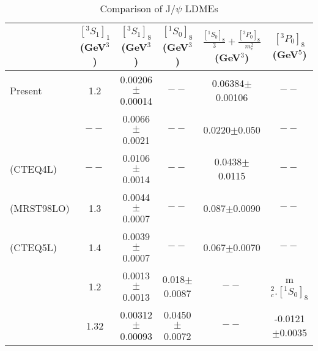 \documentclass[aps,prc,preprint,superscriptaddress,showpacs,showkeys,amsmath]{revtex4-1}
\begin{document}
\begin{enumerate}
{\begin{table}[h]
\caption{Comparison of J/$\psi$ LDMEs}
\begin{tabular}{|l|c|c|c|c|c|}
\hline            
                              &$[^3S_1]_{1}$(GeV$^3$)       &$[^3S_1]_{8}$(GeV$^3$)     &$[^1S_0]_{8}$(GeV$^3$) &$\frac{[^1S_{0}]_{8}}{3}+\frac{[^3P_0]_{8}}{m_{c}^2}$(GeV$^3$)  &$[^3P_0]_{8}$(GeV$^5$)\\        
\hline
Present                        &1.2                        &0.00206$\pm$0.00014       &$--$                 &0.06384$\pm$0.00106                                        &$--$\\
\cite{Cho:1995vh}              &$--$                       &0.0066$\pm$0.0021         &$--$                 &0.0220$\pm$0.050                                           &$--$\\
\cite{Beneke:1996yw}(CTEQ4L)    &$--$                      &0.0106$\pm$0.0014         &$--$                 &0.0438$\pm$0.0115                                          &$--$\\
\cite{Braaten:1999qk}(MRST98LO)&1.3                        &0.0044$\pm$0.0007         &$--$                 &0.087$\pm$0.0090                                           &$--$\\
\cite{Braaten:1999qk}(CTEQ5L)  &1.4                        &0.0039$\pm$0.0007         &$--$                 &0.067$\pm$0.0070                                           &$--$\\
\cite{Sharma:2012dy}           &1.2                        &0.0013$\pm$0.0013         &0.018$\pm$0.0087     &$--$                                                      &m$_{c}^{2}.[^1S_0]_{8}$ \\
\cite{Butenschoen:2010rq}     &1.32                        &0.00312$\pm$0.00093       &0.0450$\pm$0.0072    &$--$                                                      &-0.0121$\pm$0.0035\\
\hline
\end{tabular}
\label{table:LDMEJPsi}
\end{table}

}
\end{enumerate}
\end{document}
